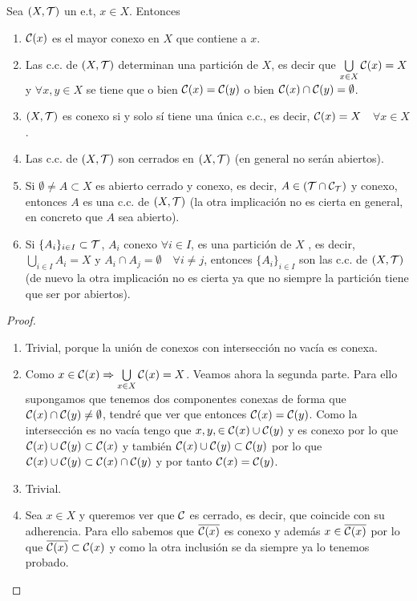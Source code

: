 \begin{prop}
    Sea $(X, \mathcal{T})$ un e.t, $x\in X$. Entonces
    \begin{enumerate}
        \item[(i)] $\mathcal{C}(x)$ es el mayor conexo en $X$ que contiene a $x$.
        \item[(ii)] Las c.c. de $(X, \mathcal{T})$ determinan una partición de $X$, es decir que $\bigcup\limits_{x\in X}\mathcal{C}(x)=X$ y $\forall x,y\in X$ se tiene que o bien $\mathcal{C}(x)=\mathcal{C}(y)$ o bien $\mathcal{C}(x)\cap \mathcal{C}(y)=\emptyset$.
        \item[(iii)] $(X, \mathcal{T})$ es conexo si y solo sí tiene una única c.c., es decir, $\mathcal{C}(x)=X$\ \ $\forall x \in X$.
        \item[(iv)] Las c.c. de $(X, \mathcal{T})$ son cerrados en $(X, \mathcal{T})$ (en general no serán abiertos).
        \item[(v)] Si $\emptyset \neq A \subset X$ es abierto cerrado y conexo, es decir, $A\in (\mathcal{T}\cap \mathcal{C}_{\mathcal{T}})$ y conexo, entonces $A$ es una c.c. de $(X, \mathcal{T})$ (la otra implicación no es cierta en general, en concreto que $A$ sea abierto). 
        \item[(vi)] Si $\{A_i\}_{i\in I}\subset \mathcal{T}$, $A_i$ conexo $\forall i \in I$, es una partición de $X$ , es decir, $\bigcup\limits_{i\in I}A_i=X$ y $A_i\cap A_j=\emptyset$\ \ $\forall i \neq j$, entonces $\{A_i\}_{i\in I}$ son las c.c. de $(X, \mathcal{T})$ (de nuevo la otra implicación no es cierta ya que no siempre la partición tiene que ser por abiertos).
    \end{enumerate}
    \begin{proof}\
        \begin{enumerate}
            \item[(i)] Trivial, porque la unión de conexos con intersección no vacía es conexa.
            \item[(ii)] Como $x\in \mathcal{C}(x) \Rightarrow \bigcup\limits_{x\in X}\mathcal{C}(x)=X$. Veamos ahora la segunda parte. Para ello supongamos que tenemos dos componentes conexas de forma que $\mathcal{C}(x)\cap \mathcal{C}(y)\neq \emptyset $, tendré que ver que entonces $\mathcal{C}(x)=\mathcal{C}(y)$. Como la intersección es no vacía tengo que $x,y,\in \mathcal{C}(x)\cup \mathcal{C}(y)$ y es conexo por lo que $\mathcal{C}(x)\cup \mathcal{C}(y)\subset \mathcal{C}(x)$ y también $\mathcal{C}(x)\cup \mathcal{C}(y)\subset \mathcal{C}(y)$ por lo que $\mathcal{C}(x)\cup \mathcal{C}(y)\subset \mathcal{C}(x)\cap \mathcal{C}(y)$ y por tanto $\mathcal{C}(x)=\mathcal{C}(y)$.
            \item[(iii)] Trivial.
            \item[(iv)] Sea $x\in X$ y queremos ver que $\mathcal{C}$ es cerrado, es decir, que coincide con su adherencia. Para ello sabemos que $\overline{\mathcal{C}(x)}$ es conexo y además $x\in \overline{\mathcal{C}(x)}$ por lo que $\overline{\mathcal{C}(x)}\subset \mathcal{C}(x)$ y como la otra inclusión se da siempre ya lo tenemos probado.

\end{enumerate}
\end{proof}
\end{prop}
